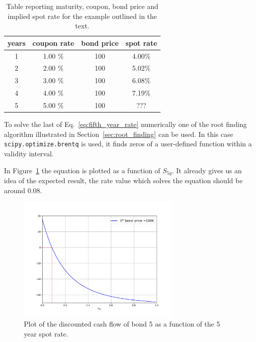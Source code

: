 \begin{table}[htb]
\begin{center}
\begin{tabular}{|c|c|c|c|}
\hline
\textbf{years} & \textbf{coupon rate} & \textbf{bond price} & \textbf{spot rate} \\
\hline
1 & 1.00 \% & 100 & 4.00\% \\
\hline
2 & 2.00 \% & 100 & 5.02\% \\
\hline
3 & 3.00 \% & 100 & 6.08\% \\
\hline
4 & 4.00 \% & 100 & 7.19\% \\
\hline
5 & 5.00 \% & 100 & ??? \\
\hline
\end{tabular}
\end{center}
\caption{Table reporting maturity, coupon, bond price and implied spot rate for the example outlined in the text.}
\label{tab:rates}
\end{table}

To solve the last of Eq.~\ref{eq:fifth_year_rate} numerically one of the root finding algorithm illustrated in Section~\ref{sec:root_finding} can be used. 
In this case \texttt{scipy.optimize.brentq} is used, it finds zeros of a user-defined function within a validity interval.

In Figure~\ref{fig:fifth_year_rate} the equation is plotted as a function of $S_{5y}$. It already gives us an idea of the expected result, the rate value which solves the equation should be around 0.08.

\begin{figure}[htb]
  \centering
  \includegraphics[width=0.7\textwidth]{figures/bond_5_plot.png}
  \caption{Plot of the discounted cash flow of bond 5 as a function of the 5 year spot rate.}
  \label{fig:fifth_year_rate}
\end{figure}

